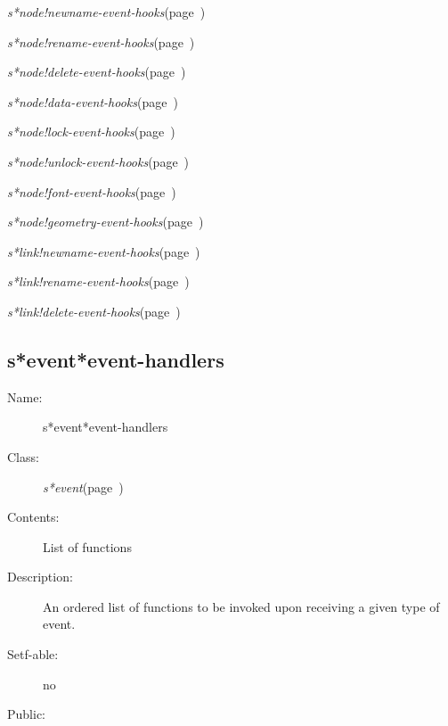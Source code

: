 \begin{description}
\item [Collections:]

\item [Subclasses:]

\item [Superclasses:]

\item [Instances:]
\item {\sl s*node!newname-event-hooks}\hfill(page~\pageref{s*node!newname-event-hooks})
\item {\sl s*node!rename-event-hooks}\hfill(page~\pageref{s*node!rename-event-hooks})
\item {\sl s*node!delete-event-hooks}\hfill(page~\pageref{s*node!delete-event-hooks})
\item {\sl s*node!data-event-hooks}\hfill(page~\pageref{s*node!data-event-hooks})
\item {\sl s*node!lock-event-hooks}\hfill(page~\pageref{s*node!lock-event-hooks})
\item {\sl s*node!unlock-event-hooks}\hfill(page~\pageref{s*node!unlock-event-hooks})
\item {\sl s*node!font-event-hooks}\hfill(page~\pageref{s*node!font-event-hooks})
\item {\sl s*node!geometry-event-hooks}\hfill(page~\pageref{s*node!geometry-event-hooks})
\item {\sl s*link!newname-event-hooks}\hfill(page~\pageref{s*link!newname-event-hooks})
\item {\sl s*link!rename-event-hooks}\hfill(page~\pageref{s*link!rename-event-hooks})
\item {\sl s*link!delete-event-hooks}\hfill(page~\pageref{s*link!delete-event-hooks})












\end{description}
\horizontalline

\subsection{s*event*event-handlers}
\label{s*event*event-handlers}

\begin{description}
\item [Name:]  s*event*event-handlers

\item [Class:]
{\sl s*event}\hfill(page~\pageref{s*event})

\item [Contents:] List of functions

\item [Description:] 
An ordered list of functions to be invoked upon
receiving a given type of event.


\item [Setf-able:] no

\item [Public:]



\end{description}
\horizontalline

